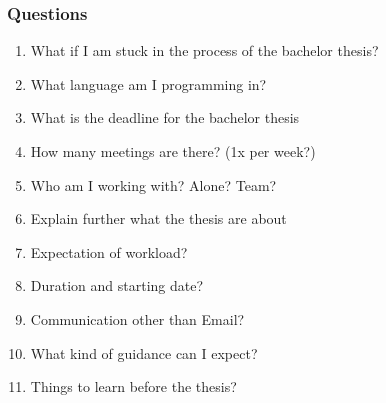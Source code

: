 \documentclass{article}
\begin{document}
\subsubsection*{Questions}

\begin{enumerate}[label=\textbf{\arabic*.}]
    \item What if I am stuck in the process of the bachelor thesis?
    \item What language am I programming in?
    \item What is the deadline for the bachelor thesis
    \item How many meetings are there? (1x per week?)
    \item Who am I working with? Alone? Team?
    \item Explain further what the thesis are about
    \item Expectation of workload?
    \item Duration and starting date?
    \item Communication other than Email?
    \item What kind of guidance can I expect?
    \item Things to learn before the thesis?







\end{enumerate}
\end{document}
